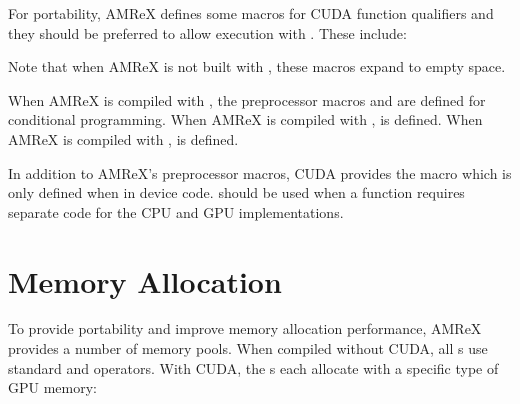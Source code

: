 \documentclass[letterpaper,10pt,english]{sphinxmanual}
\begin{document}
\sphinxAtStartPar
For portability, AMReX defines some macros for CUDA function qualifiers
and they should be preferred to allow execution with .
These include:

\begin{sphinxVerbatim}[commandchars=\\\{\}]
\end{sphinxVerbatim}

\sphinxAtStartPar
Note that when AMReX is not built with ,
these macros expand to empty space.

\sphinxAtStartPar
When AMReX is compiled with , the preprocessor
macros  and  are defined for
conditional programming.  When AMReX is compiled with
,  is defined.  When AMReX is
compiled with ,  is
defined.

\sphinxAtStartPar
In addition to AMReX’s preprocessor macros, CUDA provides the
 macro which is only defined when in device code.
 should be used when a 
function requires separate code for the CPU and GPU implementations.


\section{Memory Allocation}
\label{\detokenize{GPU:memory-allocation}}\label{\detokenize{GPU:sec-gpu-memory}}
\sphinxAtStartPar
To provide portability and improve memory allocation performance,
AMReX provides a number of memory pools.  When compiled without
CUDA, all s use standard  and 
operators. With CUDA, the s each allocate with a
specific type of GPU memory:
\end{document}
